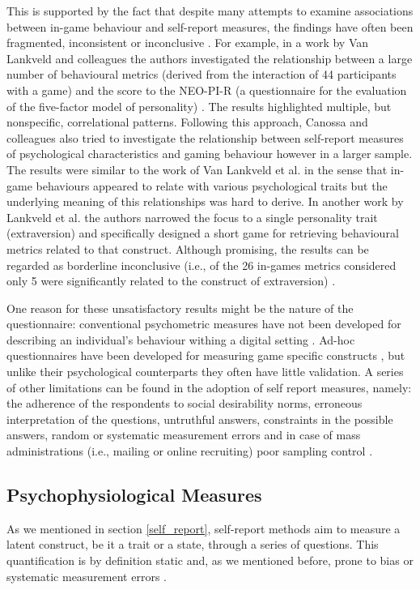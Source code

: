 This is supported by the fact that despite many attempts to examine associations between in-game behaviour and self-report measures, the findings have often been fragmented, inconsistent or inconclusive \cite{canossa2013give, stankevicius2015factor, schaekermann2017curiously}. For example, in a work by Van Lankveld and colleagues \cite{van2009psychologically} the authors investigated the relationship between a large number of behavioural metrics (derived from the interaction of 44 participants with a game) and the score to the NEO-PI-R (a questionnaire for the evaluation of the five-factor model of personality) \cite{costa2008revised}. The results highlighted multiple, but nonspecific, correlational patterns. Following this approach, Canossa and colleagues \cite{canossa2013give} also tried to investigate the relationship between self-report measures of psychological characteristics and gaming behaviour however in a larger sample. The results were similar to the work of Van Lankveld et al. in the sense that in-game behaviours appeared to relate with various psychological traits but the underlying meaning of this relationships was hard to derive. In another work by Lankveld et al. the authors narrowed the focus to a single personality trait (extraversion)  and specifically designed a short game for retrieving behavioural metrics related to that construct. Although promising, the results can be regarded as borderline inconclusive (i.e., of the 26 in-games metrics considered only 5 were significantly related to the construct of extraversion) \cite{van2011games}. 

One reason for these unsatisfactory results might be the nature of the  questionnaire: conventional psychometric measures have not been developed for describing an individual's behaviour withing a digital setting \cite{yannakakis2013player}. Ad-hoc questionnaires have been developed for measuring game specific constructs \cite{yee2006motivations,tondello2016gamification}, but unlike their psychological counterparts they often have little validation. A series of other limitations can be found in the adoption of self report measures, namely: the adherence of the respondents to social desirability norms, erroneous interpretation of the questions, untruthful answers, constraints in the possible answers, random or systematic measurement errors and in case of mass administrations (i.e., mailing or online recruiting) poor sampling control \cite{van2009psychologically}.

\subsection{Psychophysiological Measures}
\label{psychophisio} 
As we mentioned in section \ref{self_report}, self-report methods aim to measure a latent construct, be it a trait or a state, through a series of questions. This quantification is by definition static and, as we mentioned before, prone to bias or systematic measurement errors \cite{van2009psychologically}. 

